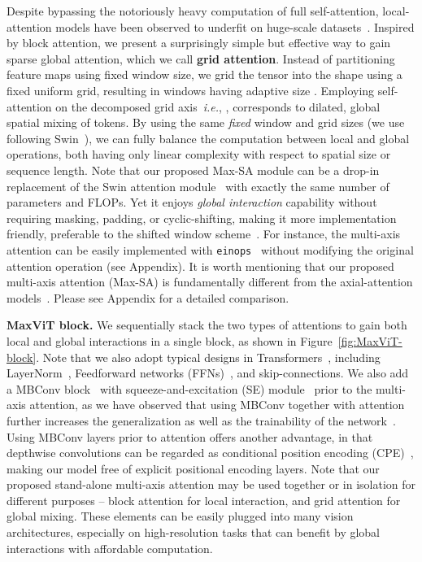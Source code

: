 \documentclass[runningheads]{llncs}
\begin{document}
Despite bypassing the notoriously heavy computation of full self-attention, local-attention models have been observed to underfit on huge-scale datasets~\cite{dai2021coatnet,dosovitskiy2020image}.
Inspired by block attention, we present a surprisingly simple but effective way to gain sparse global attention, which we call \textbf{grid attention}.
Instead of partitioning feature maps using fixed window size, we {grid} the tensor into the shape  using a fixed  uniform grid, resulting in windows having adaptive size .
Employing self-attention on the decomposed grid axis~\emph{i.e.}, , corresponds to dilated, global spatial mixing of tokens.
By using the same \textit{fixed} window and grid sizes (we use  following Swin~\cite{liu2021swin}), we can fully balance the computation between local and global operations, both having only linear complexity with respect to spatial size or sequence length.
Note that our proposed Max-SA module can be a drop-in replacement of the Swin attention module~\cite{liu2021swin} with exactly the same number of parameters and FLOPs. Yet it enjoys \textit{global interaction} capability without requiring masking, padding, or cyclic-shifting, making it more implementation friendly, preferable to the shifted window scheme~\cite{liu2021swin}.
For instance, the multi-axis attention can be easily implemented with \texttt{einops}~\cite{rogozhnikov2022einops} without modifying the original attention operation (see Appendix).
It is worth mentioning that our proposed multi-axis attention (Max-SA) is fundamentally different from the axial-attention models~\cite{wang2020axial,ho2019axial}.
Please see Appendix for a detailed comparison.















\noindent\textbf{MaxViT block.} We sequentially stack the two types of attentions to gain both local and global interactions in a single block, as shown in Figure~\ref{fig:MaxViT-block}.
Note that we also adopt typical designs in Transformers~\cite{dosovitskiy2020image,liu2021swin}, including LayerNorm~\cite{ba2016layer}, Feedforward networks (FFNs)~\cite{dosovitskiy2020image,liu2021swin}, and skip-connections.
We also add a MBConv block~\cite{howard2017mobilenets} with  squeeze-and-excitation (SE) module~\cite{hu2018squeeze} prior to the multi-axis attention, as we have observed that using MBConv together with attention further increases the generalization as well as the trainability of the network~\cite{xiao2021early}.
Using MBConv layers prior to attention offers another advantage, in that depthwise convolutions can be regarded as conditional position encoding (CPE)~\cite{chu2021conditional}, making our model free of explicit positional encoding layers.
Note that our proposed stand-alone multi-axis attention may be used together or in isolation for different purposes -- block attention for local interaction, and grid attention for global mixing.
These elements can be easily plugged into many vision architectures, especially on high-resolution tasks that can benefit by global interactions with affordable computation.
\end{document}
